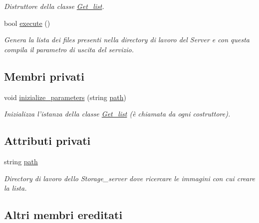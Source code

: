 \begin{DoxyCompactItemize}
\begin{DoxyCompactList}\small\item\em Distruttore della classe \hyperlink{class_get__list}{Get\-\_\-list}. \end{DoxyCompactList}\item 
bool \hyperlink{class_get__list_aa7304342c475406fdc5f6fc36540c309}{execute} ()
\begin{DoxyCompactList}\small\item\em Genera la lista dei files presenti nella directory di lavoro del {\itshape Server} e con questa compila il parametro di uscita del servizio. \end{DoxyCompactList}\end{DoxyCompactItemize}
\subsection*{Membri privati}
\begin{DoxyCompactItemize}
\item 
void \hyperlink{class_get__list_ac69fa4b93dbc29ee9ef48f6ad7042daa}{inizialize\-\_\-parameters} (string \hyperlink{class_get__list_a7880b35d31e6171ae53378d9d1d4afca}{path})
\begin{DoxyCompactList}\small\item\em Inizializza l'istanza della classe \hyperlink{class_get__list}{Get\-\_\-list} (è chiamata da ogni costruttore). \end{DoxyCompactList}\end{DoxyCompactItemize}
\subsection*{Attributi privati}
\begin{DoxyCompactItemize}
\item 
\hypertarget{class_get__list_a7880b35d31e6171ae53378d9d1d4afca}{string \hyperlink{class_get__list_a7880b35d31e6171ae53378d9d1d4afca}{path}}\label{class_get__list_a7880b35d31e6171ae53378d9d1d4afca}

\begin{DoxyCompactList}\small\item\em Directory di lavoro dello {\itshape Storage\-\_\-server} dove ricercare le immagini con cui creare la lista. \end{DoxyCompactList}\end{DoxyCompactItemize}
\subsection*{Altri membri ereditati}


